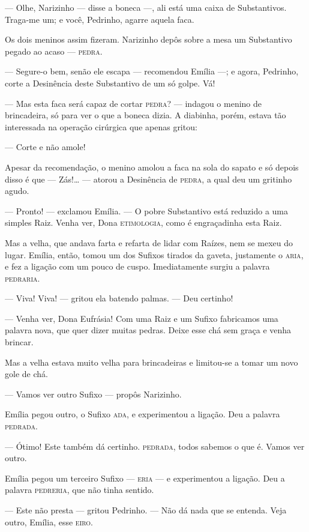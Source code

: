 --- Olhe, Narizinho --- disse a boneca ---, ali está uma caixa de
Substantivos. Traga-me um; e você, Pedrinho, agarre aquela faca.

Os dois meninos assim fizeram. Narizinho depôs sobre a mesa um
Substantivo pegado ao acaso --- \textsc{pedra}.

--- Segure-o bem, senão ele escapa --- recomendou Emília ---; e agora,
Pedrinho, corte a Desinência deste Substantivo de um só golpe. Vá!

--- Mas esta faca será capaz de cortar \textsc{pedra}? --- indagou o menino de
brincadeira, só para ver o que a boneca dizia. A diabinha, porém, estava
tão interessada na operação cirúrgica que apenas gritou:

--- Corte e não amole!

Apesar da recomendação, o menino amolou a faca na sola do sapato e só
depois disso é que --- Zás!\ldots{} --- atorou a Desinência de \textsc{pedra}, a
qual deu um gritinho agudo.

--- Pronto! --- exclamou Emília. --- O pobre Substantivo está reduzido a
uma simples Raiz. Venha ver, Dona \textsc{etimologia}, como é engraçadinha esta
Raiz.

Mas a velha, que andava farta e refarta de lidar com Raízes, nem se
mexeu do lugar. Emília, então, tomou um dos Sufixos tirados da gaveta,
justamente o \textsc{aria}, e fez a ligação com um pouco de cuspo. Imediatamente
surgiu a palavra \textsc{pedraria}.

--- Viva! Viva! --- gritou ela batendo palmas. --- Deu certinho!

--- Venha ver, Dona Eufrásia! Com uma Raiz e um Sufixo fabricamos uma
palavra nova, que quer dizer muitas pedras. Deixe esse chá sem graça e
venha brincar.

Mas a velha estava muito velha para brincadeiras e limitou-se a tomar um
novo gole de chá.

--- Vamos ver outro Sufixo --- propôs Narizinho.

Emília pegou outro, o Sufixo \textsc{ada}, e experimentou a ligação. Deu a
palavra \textsc{pedrada}.

--- Ótimo! Este também dá certinho. \textsc{pedrada}, todos sabemos o que é.
Vamos ver outro.

Emília pegou um terceiro Sufixo --- \textsc{eria} --- e experimentou a ligação.
Deu a palavra \textsc{pedreria}, que não tinha sentido.

--- Este não presta --- gritou Pedrinho. --- Não dá nada que se entenda.
Veja outro, Emília, esse \textsc{eiro}.

